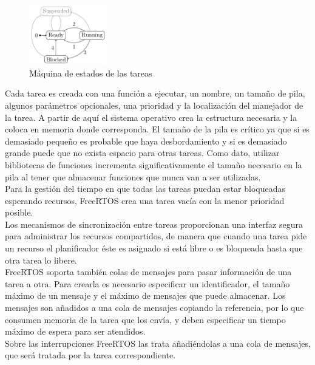 \begin{figure}[!h]
\begin{center}
\includegraphics[width=0.3\textwidth]{figs/ThreadsStates.png}
\caption{Máquina de estados de las tareas}
\label{fig:FSMThreads}
\end{center}
\end{figure}

Cada tarea es creada con una función a ejecutar, un nombre, un tamaño de pila, algunos parámetros opcionales, una prioridad y la localización del manejador de la tarea. A partir de aquí el sistema operativo crea la estructura necesaria y la coloca en memoria donde corresponda. El tamaño de la pila es crítico ya que si es demasiado pequeño es probable que haya desbordamiento y si es demasiado grande puede que no exista espacio para otras tareas. Como dato, utilizar bibliotecas de funciones incrementa significativamente el tamaño necesario en la pila al tener que almacenar funciones que nunca van a ser utilizadas.\\

Para la gestión del tiempo en que todas las tareas puedan estar bloqueadas esperando recursos, FreeRTOS crea una tarea vacía con la menor prioridad posible.\\

Los mecanismos de sincronización entre tareas proporcionan una interfaz segura para administrar los recursos compartidos, de manera que cuando una tarea pide un recurso el planificador éste es asignado si está libre o es bloqueada hasta que otra tarea lo libere.\\

FreeRTOS soporta también colas de mensajes para pasar información de una tarea a otra. Para crearla es necesario especificar un identificador, el tamaño máximo de un mensaje y el máximo de mensajes que puede almacenar. Los mensajes son añadidos a una cola de mensajes copiando la referencia, por lo que consumen memoria de la tarea que los envía, y deben especificar un tiempo máximo de espera para ser atendidos.\\

Sobre las interrupciones FreeRTOS las trata añadiéndolas a una cola de mensajes, que será tratada por la tarea correspondiente.\\

